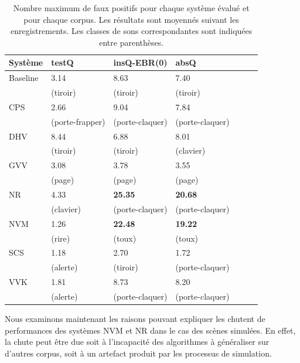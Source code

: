 \begin{table}[t]
\begin{center} 
\begin{tabular}{lllllll}  
  Système &   testQ         &  insQ-EBR(0)      &   absQ          \\
 \hline
 Baseline & 3.14            &  8.63             &  7.40    \\
          & (tiroir)        &  (tiroir)         & (tiroir) \\
      CPS & 2.66            &  9.04             &  7.84   \\
          & (porte-frapper) & (porte-claquer)   & (porte-claquer) \\
      DHV & 8.44            &  6.88             &  8.01  \\
          & (tiroir)        &  (tiroir)         &  (clavier)  \\
      GVV & 3.08            &  3.78             &  3.55   \\
          & (page)          &  (page)           & (page) \\
      NR  & 4.33            & \textbf{25.35}    & \textbf{20.68}  \\
          & (clavier)       & (porte-claquer)   & (porte-claquer)  \\
      NVM & 1.26            & \textbf{22.48}    & \textbf{19.22}    \\
          & (rire)          & (toux)            & (toux) \\
      SCS & 1.18            &  2.70             &  1.72   \\
          & (alerte)        &  (tiroir)         & (porte-claquer)  \\
      VVK & 1.81            &  8.73             &  8.20   \\ 
          & (alerte)        &  (porte-claquer)  & (porte-claquer) \\
       \hline
\end{tabular}
\end{center} 
\caption[Nombre maximum de faux positifs pour chaque système évalué et pour chaque corpus]{Nombre maximum de faux positifs pour chaque système évalué et pour chaque corpus. Les résultats sont moyennés suivant les enregistrements. Les classes de sons correspondantes sont indiquées entre parenthèses.}
\label{tab:fp}
\end{table}

Nous examinons maintenant les raisons pouvant expliquer les chutent de performances des systèmes NVM et NR dans le cas des scènes simulées. En effet, la chute peut être due soit à l'incapacité des algorithmes à généraliser sur d'autres corpus, soit à un artefact produit par les processus de simulation.

